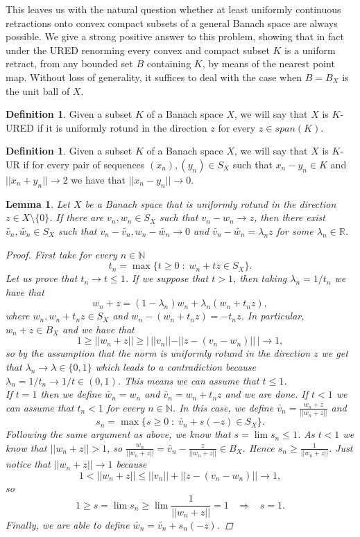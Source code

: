 \documentclass[11pt]{amsart}
\newcommand{\N}{\mathbb{N}}
\newcommand{\R}{\mathbb{R}}
\newcommand{\<}{\langle}
\renewcommand{\>}{\rangle}
\newtheorem{lemma}[theorem]{Lemma}
\theoremstyle{definition}
\newtheorem{definition}[theorem]{Definition}
\theoremstyle{remark}
\numberwithin{equation}{section}
\def\R{{\mathbb R}}
\begin{document}
This leaves us with the natural question whether at least uniformly continuous retractions onto convex compact subsets of a general Banach space are always possible.
We give a strong positive answer to this problem, showing that in fact under the URED renorming every convex and compact subset $K$ is
a uniform retract, from any bounded set $B$ containing $K$,  by means of the nearest point map. Without loss of generality, it suffices to deal with the case when $B=B_X$ is the unit ball of $X$.



\begin{definition}
Given a subset $K$ of a Banach space $X$, we will say that $X$ is $K$-URED if it is uniformly rotund in the direction $z$ for every $z\in span(K)$.
\end{definition}

\begin{definition}
Given a subset $K$ of a Banach space $X$, we will say that $X$ is $K$-UR if for every pair of sequences $(x_n),(y_n)\in S_X$ such that $x_n-y_n\in K$ and $||x_n+y_n||\rightarrow 2$ we have that $||x_n-y_n||\rightarrow 0$.
\end{definition}

\begin{lemma}\label{lemmamainUR}
Let $X$ be a Banach space that is uniformly rotund in the direction $z\in X\setminus\{0\}$. If there are $v_n,w_n\in S_X$ such that $v_n-w_n\rightarrow z$, then there exist $\widetilde{v_n},\widetilde{w_n}\in S_X$ such that $v_n-\widetilde{v_n},w_n-\widetilde{w_n}\rightarrow 0$ and $\widetilde{v_n}-\widetilde{w_n}=\lambda_nz$ for some $\lambda_n\in\R$.
\begin{proof}
First take for every $n\in\N$
$$t_n=\max\{t\ge0\;:\;w_n+tz\in S_X\}.$$
Let us prove that $t_n\rightarrow t\le1$. If we suppose that $t>1$, then taking $\lambda_n=1/t_n$ we have that
$$w_n+z=(1-\lambda_n)w_n+\lambda_n(w_n+t_nz),$$
where  $w_n,w_n+t_nz\in S_X$ and $w_n-(w_n+t_nz)=-t_nz$. In particular, $w_n+z\in B_X$  and we have that
$$1\ge||w_n+z||\ge |\,||v_n||-||z-(v_n-w_n)||\,|\rightarrow 1,$$
so by the assumption that the norm is uniformly rotund in the direction $z$ we get that $\lambda_n\rightarrow\lambda\in\{0,1\}$ which leads to a contradiction because $\lambda_n=1/t_n\rightarrow1/t\in(0,1)$. This means we can assume that $t\le1$.\\

If $t=1$ then we define $\widetilde{w_n}=w_n$ and $\widetilde{v_n}=w_n+t_nz$ and we are done. If $t<1$ we can assume that $t_n<1$ for every $n\in\N$. In this case, we define $\widetilde{v_n}=\frac{w_n+z}{||w_n+z||}$ and
$$s_n=\max\{s\ge0\;:\;\widetilde{v_n}+s(-z)\in S_X\}.$$
Following the same argument as above, we know that $s=\lim s_n\le1$. As $t<1$ we know that $||w_n+z||>1$, so $\frac{w_n}{||w_n+z||}=\widetilde{v_n}-\frac{z}{||w_n+z||}\in B_X$. Hence $s_n\ge \frac{1}{||w_n+z||}$. Just notice that $||w_n+z||\rightarrow 1$ because
$$1<||w_n+z||\le||v_n||+||z-(v_n-w_n)||\rightarrow 1,$$
so
$$1\ge s=\lim s_n\ge\lim\frac{1}{||w_n+z||}=1\;\;\;\Rightarrow\;\;\;s=1.$$
Finally, we are able to define $\widetilde{w_n}=\widetilde{v_n}+s_n(-z)$.
\end{proof}
\end{lemma}
\end{document}

